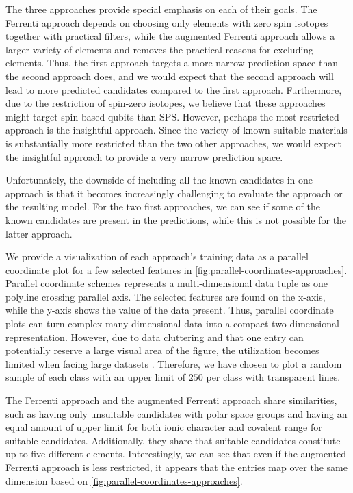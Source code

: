 The three approaches provide special emphasis on each of their goals. The Ferrenti approach depends on choosing only elements with zero spin isotopes together with practical filters, while the augmented Ferrenti approach allows a larger variety of elements and removes the practical reasons for excluding elements. Thus, the first approach targets a more narrow prediction space than the second approach does, and we would expect that the second approach will lead to more predicted candidates compared to the first approach. Furthermore, due to the restriction of spin-zero isotopes, we believe that these approaches might target spin-based qubits than SPS.
However, perhaps the most restricted approach is the insightful approach. Since the variety of known suitable materials is substantially more restricted than the two other approaches, we would expect the insightful approach to provide a very narrow prediction space.


Unfortunately, the downside of including all the known candidates in one approach is that it becomes increasingly challenging to evaluate the approach or the resulting model. For the two first approaches, we can see if some of the known candidates are present in the predictions, while this is not possible for the latter approach.

We provide a visualization of each approach's training data as a parallel coordinate plot for a few selected features in \autoref{fig:parallel-coordinates-approaches}. Parallel coordinate schemes \cite{Inselberg1985, Inselberga1990} represents a multi-dimensional data tuple as one polyline crossing parallel axis. The selected features are found on the x-axis, while the y-axis shows the value of the data present. Thus, parallel coordinate plots can turn complex many-dimensional data into a compact two-dimensional representation. However, due to data cluttering and that one entry can potentially reserve a large visual area of the figure, the utilization becomes limited when facing large datasets \cite{Ericsona}. Therefore, we have chosen to plot a random sample of each class with an upper limit of $250$ per class with transparent lines.

The Ferrenti approach and the augmented Ferrenti approach share similarities, such as having only unsuitable candidates with polar space groups and having an equal amount of upper limit for both ionic character and covalent range for suitable candidates. Additionally, they share that suitable candidates constitute up to five different elements. Interestingly, we can see that even if the augmented Ferrenti approach is less restricted, it appears that the entries map over the same dimension based on \autoref{fig:parallel-coordinates-approaches}.

